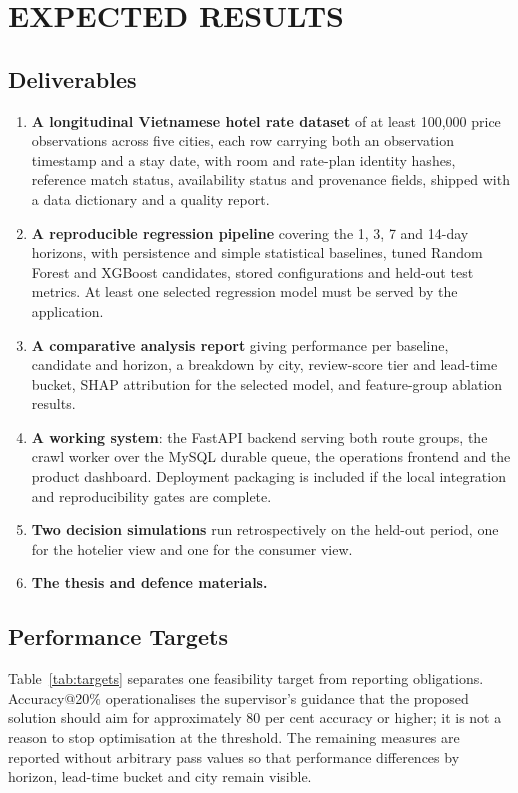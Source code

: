 \chapter{EXPECTED RESULTS}

\section{Deliverables}

\begin{enumerate}[leftmargin=*, itemsep=1pt, parsep=0pt, topsep=2pt]
    \item \textbf{A longitudinal Vietnamese hotel rate dataset} of at least 100,000 price observations across five cities, each row carrying both an observation timestamp and a stay date, with room and rate-plan identity hashes, reference match status, availability status and provenance fields, shipped with a data dictionary and a quality report.
    \item \textbf{A reproducible regression pipeline} covering the 1, 3, 7 and 14-day horizons, with persistence and simple statistical baselines, tuned Random Forest and XGBoost candidates, stored configurations and held-out test metrics. At least one selected regression model must be served by the application.
    \item \textbf{A comparative analysis report} giving performance per baseline, candidate and horizon, a breakdown by city, review-score tier and lead-time bucket, SHAP attribution for the selected model, and feature-group ablation results.
    \item \textbf{A working system}: the FastAPI backend serving both route groups, the crawl worker over the MySQL durable queue, the operations frontend and the product dashboard. Deployment packaging is included if the local integration and reproducibility gates are complete.
    \item \textbf{Two decision simulations} run retrospectively on the held-out period, one for the hotelier view and one for the consumer view.
    \item \textbf{The thesis and defence materials.}
\end{enumerate}

\section{Performance Targets}

Table~\ref{tab:targets} separates one feasibility target from reporting obligations. Accuracy@20\% operationalises the supervisor's guidance that the proposed solution should aim for approximately 80 per cent accuracy or higher; it is not a reason to stop optimisation at the threshold. The remaining measures are reported without arbitrary pass values so that performance differences by horizon, lead-time bucket and city remain visible.

